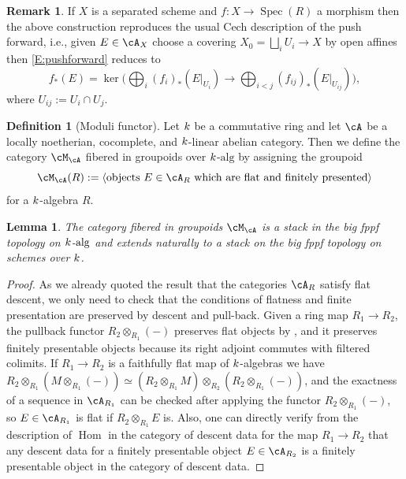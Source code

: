 \documentclass[a4paper]{amsart}
\numberwithin{equation}{section}
\theoremstyle{plain}
\newtheorem{lem}[thm]{Lemma}
\theoremstyle{definition}
\newtheorem{rem}[thm]{Remark}
\newtheorem{defn}[thm]{Definition}
\DeclareMathOperator{\Spec}{Spec}
\DeclareMathOperator{\Hom}{Hom}
\newcommand{\co}{\colon}
\begin{document}
\begin{rem} \label{R:Cech_pushforward}
	If $X$ is a separated scheme and $f\co X \to \Spec(R)$ a morphism then the above construction reproduces the usual Cech description of the push forward, i.e., given $E\in \cA_X$ choose a covering $X_0 = \bigsqcup_i U_i \to X$ by open affines then \eqref{E:pushforward} reduces to $$f_\ast(E) = \ker \bigg( \bigoplus_i (f_i)_\ast(E|_{U_i}) \to \bigoplus_{i<j} (f_{ij})_\ast(E|_{U_{ij}}) \bigg),$$ where $U_{ij}:= U_i \cap U_j$.
\end{rem}




\begin{defn}[Moduli functor]\label{D:abelian_moduli}
	Let ${k}$ be a commutative ring and let $\cA$ be a locally noetherian, cocomplete, and ${k}$-linear abelian category. Then we define the category $\cM_{\cA}$ fibered in groupoids over $k$-$\text{alg}$ by assigning the groupoid
	\[
	\cM_\cA(R) := \langle \text{objects } E \in \cA_R \text{ which are flat and finitely presented} \rangle 
	\]
	for a $k$-algebra $R$.
\end{defn}

\begin{lem}
	The category fibered in groupoids $\cM_\cA$ is a stack in the big fppf topology on $k$-${\rm alg}$ and extends naturally to a stack on the big fppf topology on schemes over $k$.
\end{lem}
\begin{proof}
	As we already quoted the result \cite[Thm.~C8.6]{artin-zhang} that the categories $\cA_R$ satisfy flat descent, we only need to check that the conditions of flatness and finite presentation are preserved by descent and pull-back. Given a ring map $R_1 \to R_2$, the pullback functor $R_2 \otimes_{R_1} (-)$ preserves flat objects by \cite[Lem.~C1.2]{artin-zhang}, and it preserves finitely presentable objects because its right adjoint  commutes with filtered colimits. If $R_1\to R_2$ is a faithfully flat map of $k$-algebras we have $R_2 \otimes_{R_1}(M \otimes_{R_1} (-)) \simeq (R_2 \otimes_{R_1} M) \otimes_{R_2} (R_2 \otimes_{R_1}(-))$, and the exactness of a sequence in $\cA_{R_1}$ can be checked after applying the functor $R_2 \otimes_{R_1}(-)$, so $E \in \cA_{R_1}$ is flat if $R_2 \otimes_{R_1} E$ is. Also, one can directly verify from the description of $\Hom$ in the category of descent data for the map $R_1 \to R_2$ that any descent data for a finitely presentable object $E \in \cA_{R_2}$ is a finitely presentable object in the category of descent data.
\end{proof}
\end{document}
